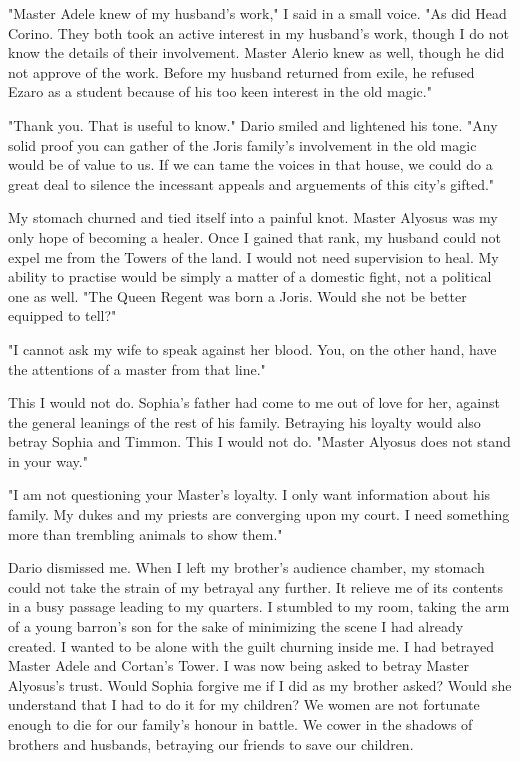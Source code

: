 \documentclass{article}
\begin{document}
"Master Adele knew of my husband's work," I said in a small voice. "As did Head Corino. They both took an active interest in my husband's work, though I do not know the details of their involvement. Master Alerio knew as well, though he did not approve of the work. Before my husband returned from exile, he refused Ezaro as a student because of his too keen interest in the old magic."

"Thank you. That is useful to know." Dario smiled and lightened his tone. "Any solid proof you can gather of the Joris family's involvement in the old magic would be of value to us. If we can tame the voices in that house, we could do a great deal to silence the incessant appeals and arguements of this city's gifted."

My stomach churned and tied itself into a painful knot. Master Alyosus was my only hope of becoming a healer. Once I gained that rank, my husband could not expel me from the Towers of the land. I would not need supervision to heal. My ability to practise would be simply a matter of a domestic fight, not a political one as well. "The Queen Regent was born a Joris. Would she not be better equipped to tell?"

"I cannot ask my wife to speak against her blood. You, on the other hand, have the attentions of a master from that line."

This I would not do. Sophia's father had come to me out of love for her, against the general leanings of the rest of his family. Betraying his loyalty would also betray Sophia and Timmon. This I would not do. "Master Alyosus does not stand in your way."

"I am not questioning your Master's loyalty. I only want information about his family. My dukes and my priests are converging upon my court. I need something more than trembling animals to show them."

Dario dismissed me. When I left my brother's audience chamber, my stomach could not take the strain of my betrayal any further. It relieve me of its contents in a busy passage leading to my quarters. I stumbled to my room, taking the arm of a young barron's son for the sake of minimizing the scene I had already created. I wanted to be alone with the guilt churning inside me. I had betrayed Master Adele and Cortan's Tower. I was now being asked to betray Master Alyosus's trust. Would Sophia forgive me if I did as my brother asked? Would she understand that I had to do it for my children? We women are not fortunate enough to die for our family's honour in battle. We cower in the shadows of brothers and husbands, betraying our friends to save our children. 
\end{document}
